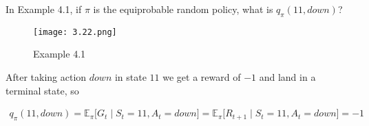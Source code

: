 \begin{exercise}
In Example 4.1, if $\pi$ is the equiprobable random policy, what is $q_\pi(11, \mathit{down})$?

\begin{figure}[H]
    \centering
    \texttt{[image: 3.22.png]}
    \caption{Example 4.1}
    \label{fig:3.22.1}
\end{figure}

\end{exercise}

\begin{solution}
  After taking action $down$ in state $11$ we get a reward of $-1$ and land in a terminal state, so

  \begin{align*}
    q_\pi(11, down)
    =
    \mathbb{E}_\pi\big[G_t \mid S_t = 11, A_t = down\big]
    =
    \mathbb{E}_\pi\big[R_{t+1} \mid S_t = 11, A_t = down\big]
    =
    -1
  \end{align*}
\end{solution}
